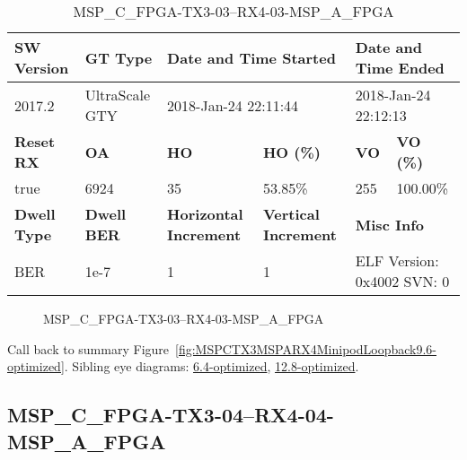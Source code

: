 \begin{table}[h]
\centering
\caption{MSP\_C\_FPGA-TX3-03--RX4-03-MSP\_A\_FPGA}
\label{tab:MSPCFPGATX303RX403MSPAFPGA9.6-optimized}
\begin{tabular}{@{}|l|l|l|l|l|l|@{}}
\toprule
\textbf{SW Version}                & \textbf{GT Type}   & \multicolumn{2}{l|}{\textbf{Date and Time Started}}            & \multicolumn{2}{l|}{\textbf{Date and Time Ended}}        \\ \midrule
2017.2                       & UltraScale GTY          & \multicolumn{2}{l|}{2018-Jan-24 22:11:44}                   & \multicolumn{2}{l|}{2018-Jan-24 22:12:13}               \\ \midrule
\textbf{Reset RX}                  & \textbf{OA} & \textbf{HO}   & \textbf{HO (\%)} & \textbf{VO} & \textbf{VO (\%)} \\ \midrule
true & 6924        & 35          & 53.85\%        & 255        & 100.00\%       \\ \midrule
\textbf{Dwell Type}                & \textbf{Dwell BER} & \textbf{Horizontal Increment} & \textbf{Vertical Increment}    & \multicolumn{2}{l|}{\textbf{Misc Info}}                  \\ \midrule
BER                            & 1e-7        & 1        & 1           & \multicolumn{2}{l|}{ELF Version: 0x4002 SVN: 0}                         \\ \bottomrule
\end{tabular}
\end{table}

\begin{figure}[h]
\caption{MSP\_C\_FPGA-TX3-03--RX4-03-MSP\_A\_FPGA} \label{fig:MSPCFPGATX303RX403MSPAFPGA9.6-optimized}
\end{figure}

Call back to summary Figure~\ref{fig:MSPCTX3MSPARX4MinipodLoopback9.6-optimized}.
Sibling eye diagrams: \hyperref[sec:MSPCFPGATX303RX403MSPAFPGA6.4-optimized]{6.4-optimized}, \hyperref[sec:MSPCFPGATX303RX403MSPAFPGA12.8-optimized]{12.8-optimized}.

\clearpage
\newpage


\subsection{MSP\_C\_FPGA-TX3-04--RX4-04-MSP\_A\_FPGA}\label{sec:MSPCFPGATX304RX404MSPAFPGA9.6-optimized}

